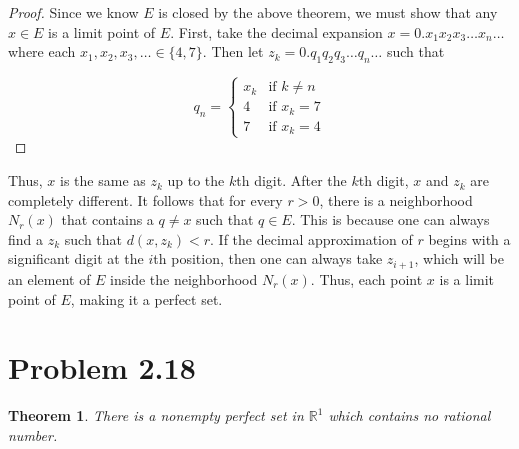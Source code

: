 \documentclass[psamsfonts]{amsart}
\newtheorem{thm}{Theorem}[section]
\theoremstyle{definition}
\theoremstyle{remark}
\numberwithin{equation}{section}
\begin{document}
\begin{proof}
Since we know $E$ is closed by the above theorem, we must show that any $x \in E$ is a limit point of $E$. First, take the decimal expansion $x = 0.x_1 x_2 x_3 \ldots x_n \ldots$ where each $x_1,x_2,x_3, \ldots \in \{4,7\}$. Then let $z_k = 0. q_1 q_2 q_3 \ldots q_n \ldots$ such that

\begin{displaymath}
q_n = \left\{
\begin{array}{ll}
x_k&\text{if } k \neq n \\
4 & \text{if } x_k = 7 \\
7 & \text{if } x_k = 4
\end{array}
\right.
\end{displaymath}
\end{proof}

Thus, $x$ is the same as $z_k$ up to the $k$th digit. After the $k$th digit, $x$ and $z_k$ are completely different. It follows that for every $r>0$, there is a neighborhood $N_r(x)$ that contains a $q \neq x$ such that $q \in E$. This is because one can always find a $z_k$ such that $d(x,z_k) < r$. If the decimal approximation of $r$ begins with a significant digit at the $i$th position, then one can always take $z_{i+1}$, which will be an element of $E$ inside the neighborhood $N_r(x)$. Thus, each point $x$ is a limit point of $E$, making it a perfect set.

\section{Problem 2.18}

\begin{thm}
There is a nonempty perfect set in $\mathbb{R}^1$ which contains no rational number.
\end{thm}
\end{document}
